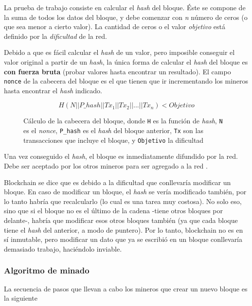 La prueba de trabajo consiste en calcular el \emph{hash} del bloque. Éste se compone de la suma de todos los datos del bloque, y debe comenzar con \emph{n} número de ceros (o que sea menor a cierto valor). La cantidad de ceros o el valor \emph{objetivo} está definido por la \emph{dificultad} de la red.     

Debido a que es fácil calcular el \emph{hash} de un valor, pero imposible conseguir el valor original a partir de un \emph{hash}, la única forma de calcular el \emph{hash} del bloque es \textbf{con fuerza bruta} (probar valores hasta encontrar un resultado). El campo \texttt{nonce} de la cabecera del bloque es el que tienen que ir incrementando los mineros hasta encontrar el \emph{hash} indicado.

\begin{figure}[H]
    \centering
    \[ H(N || P\_hash|| Tx_1 || Tx_2 || ... || Tx_n) < Objetivo \]
    \caption*{Cálculo de la cabecera del bloque, donde \texttt{H} es la función de \emph{hash}, \texttt{N} es el \emph{nonce}, \texttt{P\_hash} es el \emph{hash} del bloque anterior, \texttt{Tx} son las transacciones que incluye el bloque, y \texttt{Objetivo} la dificultad}
\end{figure}

Una vez conseguido el \emph{hash}, el bloque es inmediatamente difundido por la red. Debe ser aceptado por los otros mineros para ser agregado a la red \autocite{MasteringBlockchainProofOfWork}. 

Blockchain se dice que es  debido a la dificultad que conllevaría modificar un bloque. En caso de modificar un bloque, el \emph{hash} se vería modificado también, por lo tanto habría que recalcularlo (lo cual es una tarea muy costosa). No solo eso, sino que si el bloque no es el último de la cadena -tiene otros bloques por delante-, habría que modificar esos otros bloques también (ya que cada bloque tiene el \emph{hash} del anterior, a modo de puntero). Por lo tanto, blockchain no es en sí inmutable, pero modificar un dato que ya se escribió en un bloque conllevaría demasiado trabajo, haciéndolo inviable.

\subsubsection*{Algoritmo de minado}

La secuencia de pasos que llevan a cabo los mineros que crear un nuevo bloque es la siguiente \autocite{MasteringBlockchainMiningAlgorithm}

